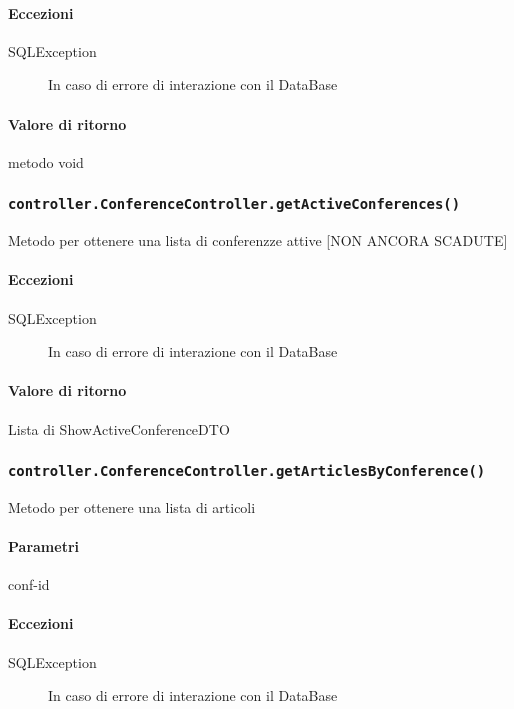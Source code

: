 \paragraph{Eccezioni}
\begin{description}
\item[SQLException] In caso di errore di interazione con il DataBase
\end{description}
\paragraph{Valore di ritorno}
metodo void

\subsubsection{\texttt{controller.ConferenceController.getActiveConferences()}}
Metodo per ottenere una lista di conferenzze attive [NON ANCORA SCADUTE]
\paragraph{Eccezioni}
\begin{description}
\item[SQLException] In caso di errore di interazione con il DataBase
\end{description}
\paragraph{Valore di ritorno}
Lista di ShowActiveConferenceDTO

\subsubsection{\texttt{controller.ConferenceController.getArticlesByConference()}}
Metodo per ottenere una lista di articoli
\paragraph{Parametri}
\begin{description}
\item conf-id
\end{description}
\paragraph{Eccezioni}
\begin{description}
\item[SQLException] In caso di errore di interazione con il DataBase
\end{description}
